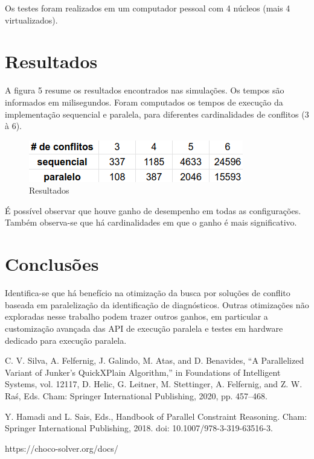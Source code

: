 \documentclass[conference]{IEEEtran}
\begin{document}
Os testes foram realizados em um computador pessoal com 4 núcleos (mais 4 virtualizados).

\section{Resultados}

A figura 5 resume os resultados encontrados nas simulações. Os tempos são informados em milisegundos. Foram computados os tempos de execução da implementação sequencial e paralela, para diferentes cardinalidades de conflitos (3 à 6).

\begin{figure}[htbp]
\centerline{\includegraphics[width=0.7\columnwidth]{result_table.png}}
\caption{Resultados} 
\label{fig}
\end{figure}

É possível observar que houve ganho de desempenho em todas as configurações. Também observa-se que há cardinalidades em que o ganho é mais significativo.

\section{Conclusões}

Identifica-se que há benefício na otimização da busca por soluções de conflito baseada em paralelização da identificação de diagnósticos. Outras otimizações não exploradas nesse trabalho podem trazer outros ganhos, em particular a customização avançada das API de execução paralela e testes em hardware dedicado para execução paralela.

\begin{thebibliography}{00}
 C. V. Silva, A. Felfernig, J. Galindo, M. Atas, and D. Benavides, “A Parallelized Variant of Junker’s QuickXPlain Algorithm,” in Foundations of Intelligent Systems, vol. 12117, D. Helic, G. Leitner, M. Stettinger, A. Felfernig, and Z. W. Raś, Eds. Cham: Springer International Publishing, 2020, pp. 457–468.

 Y. Hamadi and L. Sais, Eds., Handbook of Parallel Constraint Reasoning. Cham: Springer International Publishing, 2018. doi: 10.1007/978-3-319-63516-3.

 https://choco-solver.org/docs/
\end{thebibliography}
\vspace{12pt}
\end{document}
